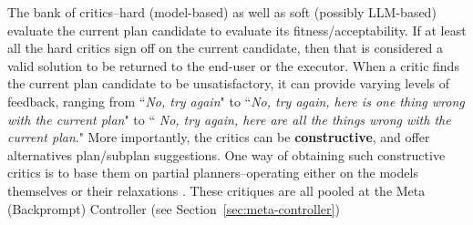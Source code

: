 \documentclass{article}
\newcommand{\bnote}[1]{\color{black}#1\color{black}}
\newcommand{\rao}[1]{\noindent\textcolor{red}{#1}}
\theoremstyle{plain}
\theoremstyle{definition}
\theoremstyle{remark}
\begin{document}




The bank of critics--hard (model-based) as well as soft (possibly
LLM-based) evaluate the current plan candidate to evaluate its
fitness/acceptability. If at least all the hard critics sign off on the
current candidate, then that is considered a valid solution to be
returned to the end-user or the executor. When a critic finds the
current plan candidate to be unsatisfactory, it can provide varying
levels of feedback, ranging from ``{\em No, try again}" to ``{\em No,
  try again, here is one thing wrong with the current plan}" to ``{\em
  No, try again, here are all the things wrong with the current
  plan}."
%
\bnote{More importantly, the critics can be {\bf constructive}, and offer
alternatives plan/subplan suggestions. One way of obtaining such
constructive critics is to base them on partial planners--operating either on
the models themselves or their relaxations
\cite{pg-heuristics-aimag}.}
%
These critiques are all pooled at the Meta (Backprompt)  Controller
(see Section~\ref{sec:meta-controller})
\end{document}
